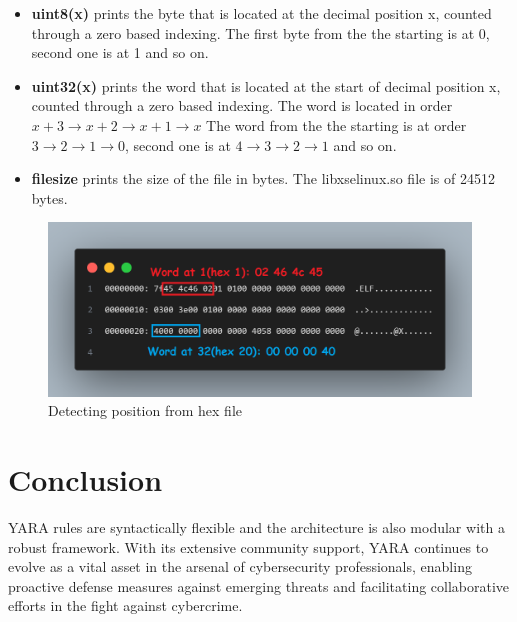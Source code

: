 \begin{itemize}

    
    \item \textbf{uint8(x)} prints the byte that is located at the decimal position x, counted through a zero based indexing. The first byte from the the starting is at 0, second one is at 1 and so on.

     \item \textbf{uint32(x)} prints the word that is located at the start of decimal position x, counted through a zero based indexing. The word is located in order $x+3 \rightarrow x+2 \rightarrow x+1 \rightarrow x$ The word from the the starting is at order $3 \rightarrow 2 \rightarrow 1 \rightarrow 0$, second one is at $4 \rightarrow 3 \rightarrow 2 \rightarrow 1$ and so on.

     \item \textbf{filesize} prints the size of the file in bytes. The libxselinux.so file is of 24512 bytes.

     
\end{itemize}

\begin{figure}[H]

    \centering
    \includegraphics[width=\textwidth]{hex_file.png}
    \caption{Detecting position from hex file}
    \label{fig:file_hex}
    
\end{figure}

\section{Conclusion}

YARA rules are syntactically flexible and the architecture is also modular with a robust framework. With its extensive community support, YARA continues to evolve as a vital asset in the arsenal of cybersecurity professionals, enabling proactive defense measures against emerging threats and facilitating collaborative efforts in the fight against cybercrime.

